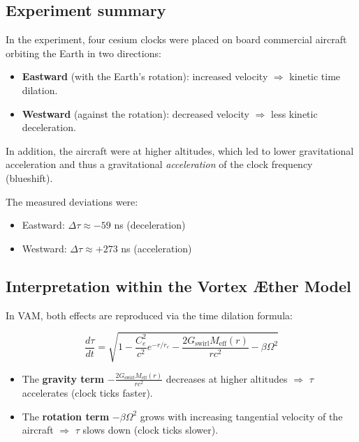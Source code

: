 \subsection{Experiment summary}

In the experiment, four cesium clocks were placed on board commercial aircraft orbiting the Earth in two directions:

\begin{itemize}
    \item \textbf{Eastward} (with the Earth's rotation): increased velocity $\Rightarrow$ kinetic time dilation.
    \item \textbf{Westward} (against the rotation): decreased velocity $\Rightarrow$ less kinetic deceleration.
\end{itemize}

In addition, the aircraft were at higher altitudes, which led to lower gravitational acceleration and thus a gravitational \emph{acceleration} of the clock frequency (blueshift).

The measured deviations were:

\begin{itemize}
    \item Eastward: $\Delta\tau \approx -59$ ns (deceleration)
    \item Westward: $\Delta\tau \approx +273$ ns (acceleration)
\end{itemize}

\subsection{Interpretation within the Vortex Æther Model}

In VAM, both effects are reproduced via the time dilation formula:

\begin{equation}
    \frac{d\tau}{dt} = \sqrt{1 - \frac{C_e^2}{c^2} e^{-r/r_c} - \frac{2G_{\text{swirl}} M_{\text{eff}}(r)}{rc^2} - \beta \Omega^2}
\end{equation}

\begin{itemize}
    \item The \textbf{gravity term} $- \frac{2G_{\text{swirl}} M_{\text{eff}}(r)}{rc^2}$ decreases at higher altitudes $\Rightarrow$ $\tau$ accelerates (clock ticks faster).
    \item The \textbf{rotation term} $-\beta \Omega^2$ grows with increasing tangential velocity of the aircraft $\Rightarrow$ $\tau$ slows down (clock ticks slower).
\end{itemize}

